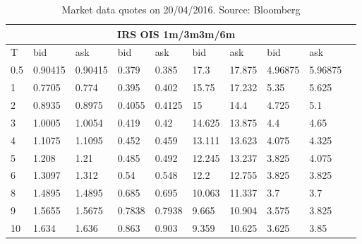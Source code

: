 \documentclass[12pt,a4paper]{article}
\theoremstyle{plain}
\numberwithin{equation}{section}
\begin{document}
\begin{table}[t]
\begin{center}
\begin{tabular}{|l|l|l|l|l|l|l|l|l|l|}

\hline
\multicolumn{9}{|c|}{IRS \;\;\;\; \;\;\;\;\;\;\;\;\;\;\;\;OIS \;\;\;\;\;\;\;\;\;\;\;\;\;\;\;\;\;1m/3m\;\;\;\;\;\;\;\;\;\;\;\;\;\;\;\;\;3m/6m} \\\hline
T& bid& ask& bid& ask& bid& ask& bid& ask\\ \hline

    0.5   & 0.90415 & 0.90415 & 0.379 & 0.385 & 17.3  & 17.875 & 4.96875 & 5.96875 \\
    1     & 0.7705 & 0.774 & 0.395 & 0.402 & 15.75 & 17.232 & 5.35  & 5.625 \\
    2     & 0.8935 & 0.8975 & 0.4055 & 0.4125 & 15    & 14.4  & 4.725 & 5.1 \\
    3     & 1.0005 & 1.0054 & 0.419 & 0.42  & 14.625 & 13.875 & 4.4   & 4.65 \\
    4     & 1.1075 & 1.1095 & 0.452 & 0.459 & 13.111 & 13.623 & 4.075 & 4.325 \\
    5     & 1.208 & 1.21  & 0.485 & 0.492 & 12.245 & 13.237 & 3.825 & 4.075 \\
    6     & 1.3097 & 1.312 & 0.54  & 0.548 & 12.2  & 12.755 & 3.825 & 3.825 \\
    8     & 1.4895 & 1.4895 & 0.685 & 0.695 & 10.063 & 11.337 & 3.7   & 3.7 \\
    9     & 1.5655 & 1.5675 & 0.7838 & 0.7938 & 9.665 & 10.904 & 3.575 & 3.825 \\
    10    & 1.634 & 1.636 & 0.863 & 0.903 & 9.359 & 10.625 & 3.625 & 3.85 \\

\hline
\end{tabular}\\[1ex]
\caption{Market data quotes on 20/04/2016. Source: Bloomberg }\label{Marketdata:20160420}
\end{center}
\end{table}
\end{document}
